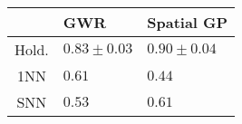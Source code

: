 \begin{tabular}{c|ll} 
        & GWR                      & Spatial GP \\ \hline
Hold. & $\mathbf{0.83 \pm 0.03}$ & $0.90 \pm 0.04$  \\
1NN     & $0.61$                   & $\mathbf{0.44}$ \\
SNN     & $\mathbf{0.53}$          & $0.61$
\end{tabular}
